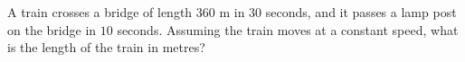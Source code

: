 A train crosses a bridge of length $360$ m in $30$ seconds, and it passes a lamp post on the bridge in $10$ seconds. Assuming the train moves at a constant speed, what is the length of the train in metres?
